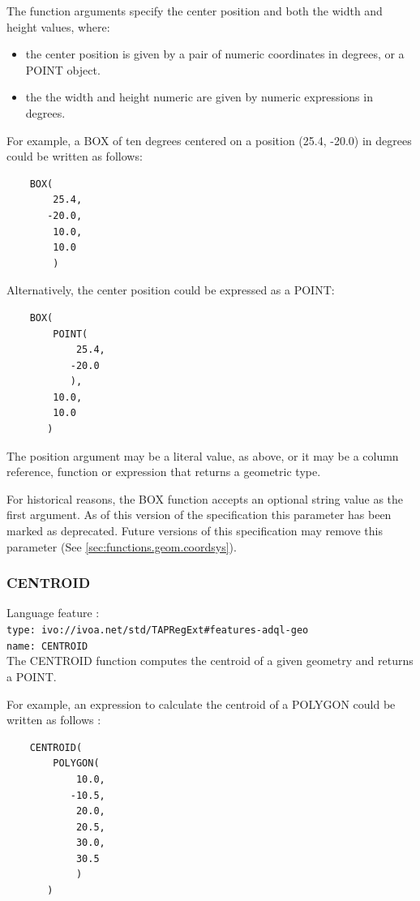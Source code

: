 \documentclass[11pt,a4paper]{ivoa}
\begin{document}
The function arguments specify the center position
and both the width and height values, where:
\begin{itemize}
    \item the center position is given by a pair of numeric coordinates in degrees, or a POINT object.
    \item the the width and height numeric are given by numeric expressions in degrees.
\end{itemize}

For example, a BOX of ten degrees centered on a position
(25.4, -20.0) in degrees could be written as follows:
\begin{verbatim}
    BOX(
        25.4,
       -20.0,
        10.0,
        10.0
        )
\end{verbatim}

Alternatively, the center position could be expressed as a POINT:
\begin{verbatim}
    BOX(
        POINT(
            25.4,
           -20.0
           ),
        10.0,
        10.0
       )
\end{verbatim}

The position argument may be a literal value, as above, or it may be a
column reference, function or expression that returns a geometric type.

For historical reasons, the BOX function accepts an optional string
value as the first argument.
As of this version of the specification this parameter has been
marked as deprecated.
Future versions of this specification may remove this parameter
(See \ref{sec:functions.geom.coordsys}).

\subsubsection{CENTROID}
\label{sec:functions.geom.centroid}
{\footnotesize Language feature :}\\
{\footnotesize \verb|type: ivo://ivoa.net/std/TAPRegExt#features-adql-geo|}\\
{\footnotesize \verb|name: CENTROID|}\\

The CENTROID function computes the centroid of a given geometry and returns a POINT.

For example, an expression to calculate the centroid of a POLYGON could
be written as follows :
\begin{verbatim}
    CENTROID(
        POLYGON(
            10.0,
           -10.5,
            20.0,
            20.5,
            30.0,
            30.5
            )
       )
\end{verbatim}
\end{document}
